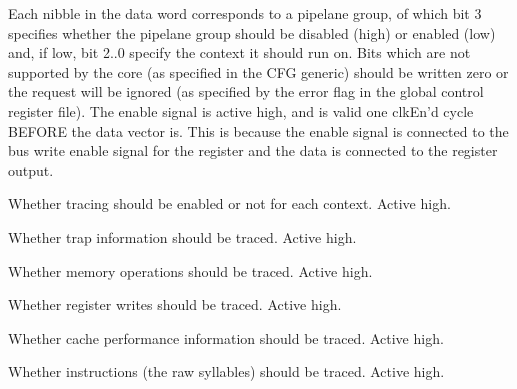 \ifaceSubGroup{}
Each nibble in the data word corresponds to a pipelane group, of which bit 3 
specifies whether the pipelane group should be disabled (high) or enabled (low) 
and, if low, bit 2..0 specify the context it should run on. Bits which are not 
supported by the core (as specified in the CFG generic) should be written zero 
or the request will be ignored (as specified by the error flag in the global 
control register file). The enable signal is active high, and is valid one 
clkEn'd cycle BEFORE the data vector is. This is because the enable signal is 
connected to the bus write enable signal for the register and the data is 
connected to the register output.

\ifaceSubGroup{}
Whether tracing should be enabled or not for each context. Active high.
    
\ifaceSubGroup{}
Whether trap information should be traced. Active high.
    
\ifaceSubGroup{}
Whether memory operations should be traced. Active high.
    
\ifaceSubGroup{}
Whether register writes should be traced. Active high.
    
\ifaceSubGroup{}
Whether cache performance information should be traced. Active high.
    
\ifaceSubGroup{}
Whether instructions (the raw syllables) should be traced. Active high.
